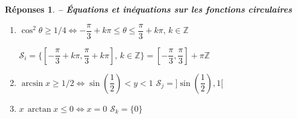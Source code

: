\documentclass[a4paper,11pt]{article}
\newenvironment{alphate}{\begin{enumerate}[label=\alph*)]}{\end{enumerate}}
\newtheorem{rep}{R\'eponses}
\newenvironment{reponse}{\begin{rep} \em}{\end{rep}}
\begin{document}
\begin{reponse} {\bf -- \'Equations et in\'equations sur les fonctions 
circulaires}
\begin{alphate}
    $\boxed{\mathcal{S}_h =]-\dfrac{\pi}{2}), 0[ + \pi \mathbb{Z} }$ 
\item $\cos^2 \theta \geq 1/4 \Leftrightarrow
    -\dfrac{\pi}{3} + k\pi \leq \theta  \leq \dfrac{\pi}{3} + k\pi, \, k \in \mathbb{Z} $ 
    \begin{center}
         $\boxed{\mathcal{S}_i = \{[-\dfrac{\pi}{3} + k\pi,\dfrac{\pi}{3} + k\pi], \, k \in \mathbb{Z}\} = [-\dfrac{\pi}{3}, \dfrac{\pi}{3}] + \pi \mathbb{Z} }$ 
    \end{center}
\item $\arcsin x \geq 1/2 \Leftrightarrow
    \sin(\dfrac{1}{2}) < y < 1 $ \hspace{1cm} 
    $\boxed{\mathcal{S}_j =]\sin(\dfrac{1}{2}), 1[ }$ 
\item $x\,\arctan x \leq 0 \Leftrightarrow
    x = 0 $ \hspace{1cm} 
    $\boxed{\mathcal{S}_k =\{0\} }$ 
\end{alphate}
\end{reponse}
\end{document}
